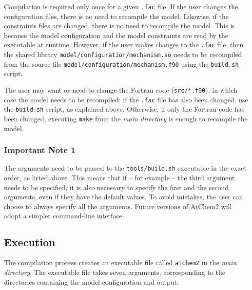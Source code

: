Compilation is required only once for a given \texttt{.fac} file. If
the user changes the configuration files, there is no need to
recompile the model. Likewise, if the constraints files are changed,
there is no need to recompile the model. This is because the model
configuration and the model constraints are read by the executable at
runtime. However, if the user makes changes to the \texttt{.fac} file,
then the shared library \texttt{model/configuration/mechanism.so}
needs to be recompiled from the source file
\texttt{model/configuration/mechanism.f90} using the \texttt{build.sh}
script.

The user may want or need to change the Fortran code
(\texttt{src/*.f90}), in which case the model needs to be recompiled:
if the \texttt{.fac} file has also been changed, use the
\texttt{build.sh} script, as explained above. Otherwise, if only the
Fortran code has been changed, executing \texttt{make} from the
\emph{main directory} is enough to recompile the model.

\subsubsection{Important Note 1} \label{important-note-1}

The arguments need to be passed to the \texttt{tools/build.sh}
executable in the exact order, as listed above. This means that if --
for example -- the third argument needs to be specified, it is also
necessary to specify the first and the second arguments, even if they
have the default values. To avoid mistakes, the user can choose to
always specify all the arguments. Future versions of AtChem2 will
adopt a simpler command-line interface.

\subsection{Execution} \label{subsec:execution}

The compilation process creates an executable file called
\texttt{atchem2} in the \emph{main directory}. The executable file
takes seven arguments, corresponding to the directories containing the
model configuration and output:

